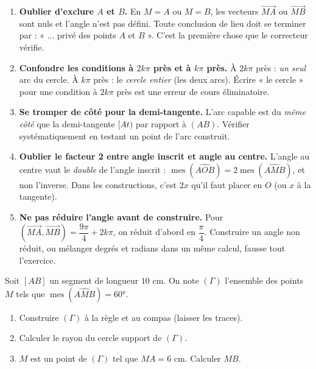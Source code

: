 \documentclass[11pt]{article}
\begin{document}
\begin{attention}
\begin{enumerate}
\item \textbf{Oublier d'exclure $A$ et $B$.} En $M=A$ ou $M=B$, les vecteurs $\overrightarrow{MA}$ ou $\overrightarrow{MB}$ sont nuls et l'angle n'est pas défini. Toute conclusion de lieu doit se terminer par : « ... privé des points $A$ et $B$ ». C'est la première chose que le correcteur vérifie.
\item \textbf{Confondre les conditions à $2k\pi$ près et à $k\pi$ près.} À $2k\pi$ près : \emph{un seul} arc du cercle. À $k\pi$ près : le \emph{cercle entier} (les deux arcs). Écrire « le cercle » pour une condition à $2k\pi$ près est une erreur de cours éliminatoire.
\item \textbf{Se tromper de côté pour la demi-tangente.} L'arc capable est du \emph{même côté} que la demi-tangente $[At)$ par rapport à $(AB)$. Vérifier systématiquement en testant un point de l'arc construit.
\item \textbf{Oublier le facteur 2 entre angle inscrit et angle au centre.} L'angle au centre vaut le \emph{double} de l'angle inscrit : $\operatorname{mes}(\widehat{AOB})=2\operatorname{mes}(\widehat{AMB})$, et non l'inverse. Dans les constructions, c'est $2x$ qu'il faut placer en $O$ (ou $x$ à la tangente).
\item \textbf{Ne pas réduire l'angle avant de construire.} Pour $(\overrightarrow{MA},\overrightarrow{MB})=\dfrac{9\pi}{4}+2k\pi$, on réduit d'abord en $\dfrac{\pi}{4}$. Construire un angle non réduit, ou mélanger degrés et radians dans un même calcul, fausse tout l'exercice.
\end{enumerate}
\end{attention}

\begin{exercice}
Soit $[AB]$ un segment de longueur $10$ cm. On note $(\Gamma)$ l'ensemble des points $M$ tels que $\operatorname{mes}(\widehat{AMB})=60°$.
\begin{enumerate}
\item Construire $(\Gamma)$ à la règle et au compas (laisser les traces).
\item Calculer le rayon du cercle support de $(\Gamma)$.
\item $M$ est un point de $(\Gamma)$ tel que $MA=6$ cm. Calculer $MB$.
\end{enumerate}
\end{exercice}
\end{document}
